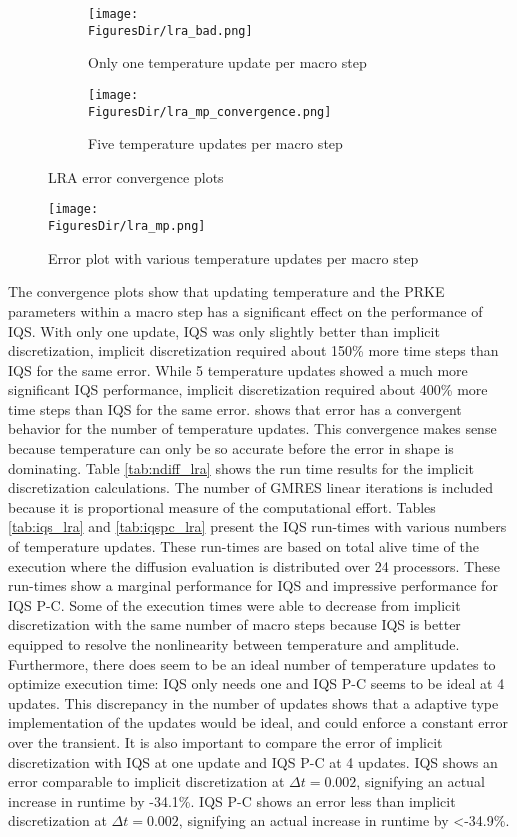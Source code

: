 \begin{figure}[!htbp]
\centering
\begin{subfigure}[!htbp]{0.49\textwidth}
\texttt{[image: \\FiguresDir/lra\_bad.png]}
\caption{Only one temperature update per macro step}
\label{fig:lra_bad}
\end{subfigure}
\begin{subfigure}[!htbp]{0.49\textwidth}
\texttt{[image: \\FiguresDir/lra\_mp\_convergence.png]}
\caption{Five temperature updates per macro step}
\label{fig:lra_mpconv}
\end{subfigure}
\caption{LRA error convergence plots}
\end{figure}

\begin{figure}[htbp!]
\centering
\texttt{[image: \\FiguresDir/lra\_mp.png]}
\caption{Error plot with various temperature updates per macro step}
\label{fig:mp}
\end{figure}

The convergence plots show that updating temperature and the PRKE parameters within a macro step has a significant effect on the performance of IQS.  With only one update, IQS was only slightly better than implicit discretization, implicit discretization required about 150\% more time steps than IQS for the same error.  While 5 temperature updates showed a much more significant IQS performance, implicit discretization required about 400\% more time steps than IQS for the same error.   shows that error has a convergent behavior for the number of temperature updates.  This convergence makes sense because temperature can only be so accurate before the error in shape is dominating. Table \ref{tab:ndiff_lra} shows the run time results for the implicit discretization calculations. The number of GMRES linear iterations is included because it is proportional measure of the computational effort. Tables \ref{tab:iqs_lra} and \ref{tab:iqspc_lra} present the IQS run-times with various numbers of temperature updates.  These run-times are based on total alive time of the execution where the diffusion evaluation is distributed over 24 processors. These run-times show a marginal performance for IQS and impressive performance for IQS P-C.  Some of the execution times were able to decrease from implicit discretization with the same number of macro steps because IQS is better equipped to resolve the nonlinearity between temperature and amplitude. Furthermore, there does seem to be an ideal number of temperature updates to optimize execution time: IQS only needs one and IQS P-C seems to be ideal at 4 updates. This discrepancy in the number of updates shows that a adaptive type implementation of the updates would be ideal, and could enforce a constant error over the transient. It is also important to compare the error of implicit discretization with IQS at one update and IQS P-C at 4 updates.  IQS shows an error comparable to implicit discretization at $\Delta t = 0.002$, signifying an actual increase in runtime by -34.1\%.  IQS P-C shows an error less than implicit discretization at $\Delta t = 0.002$, signifying an actual increase in runtime by <-34.9\%.

